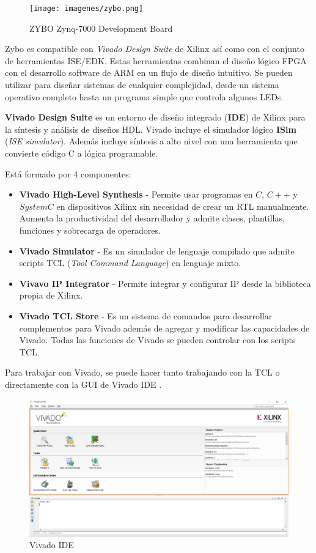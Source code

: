 \begin{figure}
    \centering
    \texttt{[image: imagenes/zybo.png]}
    \caption{ZYBO Zynq-7000 Development Board}\label{zybo}
\end{figure}

Zybo es compatible con \textit{Vivado Design Suite} de Xilinx así como con el conjunto de herramientas ISE/EDK.
Estas herramientas combinan el diseño lógico FPGA con el desarrollo software de ARM en un flujo de diseño intuitivo.
Se pueden utilizar para diseñar sistemas de cualquier complejidad, desde un sistema operativo completo hasta un programa 
simple que controla algunos LEDs.

\textbf{Vivado Design Suite} es un entorno de diseño integrado (\textbf{IDE}) de Xilinx para la síntesis y análisis de diseños HDL. Vivado incluye 
el simulador lógico \textbf{ISim} (\textit{ISE simulator}). Además incluye síntesis a alto nivel con una herramienta que convierte 
código C a lógica programable.

Está formado por 4 componentes\cite{vivado_wiki}:
\begin{itemize}
    \item \textbf{Vivado High-Level Synthesis} - Permite usar programas en \(C\), \(C++\) y \(SystemC\) en dispositivos Xilinx  sin necesidad 
    de crear un RTL manualmente. Aumenta la productividad del desarrollador y admite clases, plantillas, funciones y sobrecarga de operadores.
    \item \textbf{Vivado Simulator} - Es un simulador de lenguaje compilado que admite scripts TCL (\textit{Tool Command Language}) en lenguaje mixto.
    \item \textbf{Vivavo IP Integrator} - Permite integrar y  configurar IP desde la biblioteca propia de Xilinx.
    \item \textbf{Vivado TCL Store} - Es un sistema de comandos para desarrollar complementos para Vivado además de agregar y modificar las 
    capacidades de Vivado. Todas las funciones de Vivado se pueden controlar con los scripts TCL.
\end{itemize}

Para trabajar con Vivado, se puede hacer tanto trabajando con la TCL o directamente con la GUI de Vivado IDE \cite{vivadoIDE}. 
\begin{figure}[H]
    \centering
    \includegraphics[width = 1\textwidth]{imagenes/Vivado1.png}
    \caption{Vivado IDE}\label{vivadoGUI}
\end{figure}

